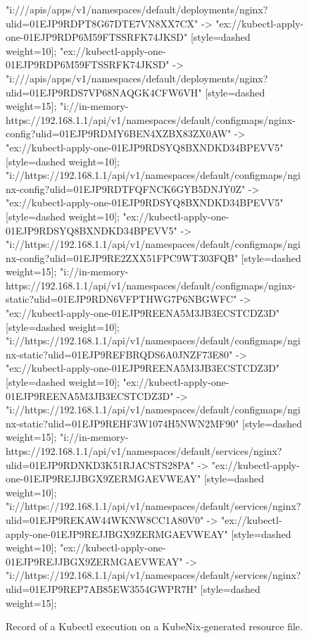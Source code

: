 \begin{figure}[p]
\begin{sideways}
{"i:///apis/apps/v1/namespaces/default/deployments/nginx?ulid=01EJP9RDPT8G67DTE7VN8XX7CX" -> "ex://kubectl-apply-one-01EJP9RDP6M59FTSSRFK74JKSD" [style=dashed weight=10];
"ex://kubectl-apply-one-01EJP9RDP6M59FTSSRFK74JKSD" -> "i:///apis/apps/v1/namespaces/default/deployments/nginx?ulid=01EJP9RDS7VP68NAQGK4CFW6VH" [style=dashed weight=15];
"i://in-memory-https://192.168.1.1/api/v1/namespaces/default/configmaps/nginx-config?ulid=01EJP9RDMY6BEN4XZBX83ZX0AW" -> "ex://kubectl-apply-one-01EJP9RDSYQ8BXNDKD34BPEVV5" [style=dashed weight=10];
"i://https://192.168.1.1/api/v1/namespaces/default/configmaps/nginx-config?ulid=01EJP9RDTFQFNCK6GYB5DNJY0Z" -> "ex://kubectl-apply-one-01EJP9RDSYQ8BXNDKD34BPEVV5" [style=dashed weight=10];
"ex://kubectl-apply-one-01EJP9RDSYQ8BXNDKD34BPEVV5" -> "i://https://192.168.1.1/api/v1/namespaces/default/configmaps/nginx-config?ulid=01EJP9RE2ZXX51FPC9WT303FQB" [style=dashed weight=15];
"i://in-memory-https://192.168.1.1/api/v1/namespaces/default/configmaps/nginx-static?ulid=01EJP9RDN6VFPTHWG7P6NBGWFC" -> "ex://kubectl-apply-one-01EJP9REENA5M3JB3ECSTCDZ3D" [style=dashed weight=10];
"i://https://192.168.1.1/api/v1/namespaces/default/configmaps/nginx-static?ulid=01EJP9REFBRQDS6A0JNZF73E80" -> "ex://kubectl-apply-one-01EJP9REENA5M3JB3ECSTCDZ3D" [style=dashed weight=10];
"ex://kubectl-apply-one-01EJP9REENA5M3JB3ECSTCDZ3D" -> "i://https://192.168.1.1/api/v1/namespaces/default/configmaps/nginx-static?ulid=01EJP9REHF3W1074H5NWN2MF90" [style=dashed weight=15];
"i://in-memory-https://192.168.1.1/api/v1/namespaces/default/services/nginx?ulid=01EJP9RDNKD3K51RJACSTS28PA" -> "ex://kubectl-apply-one-01EJP9REJJBGX9ZERMGAEVWEAY" [style=dashed weight=10];
"i://https://192.168.1.1/api/v1/namespaces/default/services/nginx?ulid=01EJP9REKAW44WKNW8CC1A80V0" -> "ex://kubectl-apply-one-01EJP9REJJBGX9ZERMGAEVWEAY" [style=dashed weight=10];
"ex://kubectl-apply-one-01EJP9REJJBGX9ZERMGAEVWEAY" -> "i://https://192.168.1.1/api/v1/namespaces/default/services/nginx?ulid=01EJP9REP7AB85EW3554GWPR7H" [style=dashed weight=15];


}
\end{sideways}
    \vspace{-2em}
    \caption{Record of a Kubectl execution on a KubeNix-generated resource file.} 
    \label{fig:kubectl-dot}
\end{figure}

